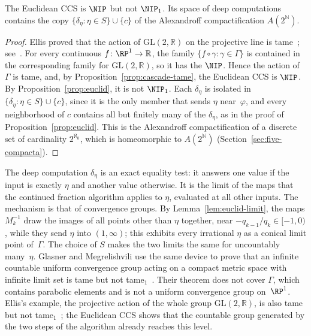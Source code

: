 \begin{cor}\label{cor:euclid}
The Euclidean CCS is $\NIP$ but not $\NIP_1$.
Its space of deep computations contains the copy
$\{\delta_\eta:\eta\in S\}\cup\{c\}$ of the Alexandroff compactification
$A(2^{\mathbb{N}})$.
\end{cor}

\begin{proof}
Ellis proved that the action of $\mathrm{GL}(2,\mathbb{R})$ on the projective line is
tame~\cite{Ellis1993}; see~\cite[Example~5.7]{glasner2022tame}.
For every continuous $f\colon\RP^1\to\mathbb{R}$, the family
$\{f\circ\gamma:\gamma\in\Gamma\}$ is contained in the corresponding family for
$\mathrm{GL}(2,\mathbb{R})$, so it has the $\NIP$.
Hence the action of $\Gamma$ is tame, and, by
Proposition~\ref{prop:cascade-tame}, the Euclidean CCS is $\NIP$.
By Proposition~\ref{prop:euclid}, it is not $\NIP_1$.
Each $\delta_\eta$ is isolated in $\{\delta_\eta:\eta\in S\}\cup\{c\}$, since it
is the only member that sends $\eta$ near~$\varphi$, and every neighborhood of
$c$ contains all but finitely many of the $\delta_\eta$, as in the proof of
Proposition~\ref{prop:euclid}.
This is the Alexandroff compactification of a discrete set of cardinality
$2^{\aleph_0}$, which is homeomorphic to $A(2^{\mathbb{N}})$
(Section~\ref{sec:five-compacta}).
\end{proof}

The deep computation $\delta_\eta$ is an exact equality test: it answers one value
if the input is exactly $\eta$ and another value otherwise.
It is the limit of the maps that the continued fraction algorithm applies to
$\eta$, evaluated at all other inputs.
The mechanism is that of convergence groups.
By Lemma~\ref{lem:euclid-limit}, the maps $M_k^{-1}$ draw the images of all
points other than $\eta$ together, near $-q_{k-1}/q_k\in[-1,0)$, while they
send $\eta$ into $(1,\infty)$; this exhibits every irrational $\eta$ as a
conical limit point of~$\Gamma$.
The choice of $S$ makes the two limits the same for uncountably many~$\eta$.
Glasner and Megrelishvili use the same device to prove that an infinite
countable uniform convergence group acting on a compact metric space with
infinite limit set is tame but not
tame$_1$~\cite[Proposition~6.1 and Theorem~6.5]{glasner2022tame}.
Their theorem does not cover $\Gamma$, which contains parabolic elements and is
not a uniform convergence group on~$\RP^1$.
Ellis's example, the projective action of the whole group
$\mathrm{GL}(2,\mathbb{R})$, is also tame but not
tame$_1$~\cite[Example~5.7]{glasner2022tame}; the Euclidean CCS shows that
the countable group generated by the two steps of the algorithm already
reaches this level.

